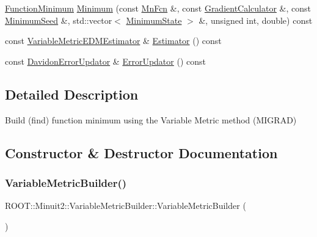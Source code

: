 \begin{DoxyCompactItemize}
\item 
\mbox{\hyperlink{classROOT_1_1Minuit2_1_1FunctionMinimum}{Function\+Minimum}} \mbox{\hyperlink{classROOT_1_1Minuit2_1_1VariableMetricBuilder_a6214271e1802f110e94725295f3900fc}{Minimum}} (const \mbox{\hyperlink{classROOT_1_1Minuit2_1_1MnFcn}{Mn\+Fcn}} \&, const \mbox{\hyperlink{classROOT_1_1Minuit2_1_1GradientCalculator}{Gradient\+Calculator}} \&, const \mbox{\hyperlink{classROOT_1_1Minuit2_1_1MinimumSeed}{Minimum\+Seed}} \&, std\+::vector$<$ \mbox{\hyperlink{classROOT_1_1Minuit2_1_1MinimumState}{Minimum\+State}} $>$ \&, unsigned int, double) const
\item 
const \mbox{\hyperlink{classROOT_1_1Minuit2_1_1VariableMetricEDMEstimator}{Variable\+Metric\+E\+D\+M\+Estimator}} \& \mbox{\hyperlink{classROOT_1_1Minuit2_1_1VariableMetricBuilder_a2440f7838cbff6043ee58272890aa210}{Estimator}} () const
\item 
const \mbox{\hyperlink{classROOT_1_1Minuit2_1_1DavidonErrorUpdator}{Davidon\+Error\+Updator}} \& \mbox{\hyperlink{classROOT_1_1Minuit2_1_1VariableMetricBuilder_aa10879d53daedb3e742f35d3c3f3b3d6}{Error\+Updator}} () const
\end{DoxyCompactItemize}


\subsection{Detailed Description}
Build (find) function minimum using the Variable Metric method (M\+I\+G\+R\+AD) 

\subsection{Constructor \& Destructor Documentation}
\mbox{\label{classROOT_1_1Minuit2_1_1VariableMetricBuilder_a3fa1bd08281c31511236e97c865f893f}} 
\subsubsection{\texorpdfstring{VariableMetricBuilder()}{VariableMetricBuilder()}\hspace{0.1cm}{\footnotesize\ttfamily [1/3]}}
{\footnotesize\ttfamily R\+O\+O\+T\+::\+Minuit2\+::\+Variable\+Metric\+Builder\+::\+Variable\+Metric\+Builder (\begin{DoxyParamCaption}{ }\end{DoxyParamCaption})\hspace{0.3cm}{\ttfamily [inline]}}


